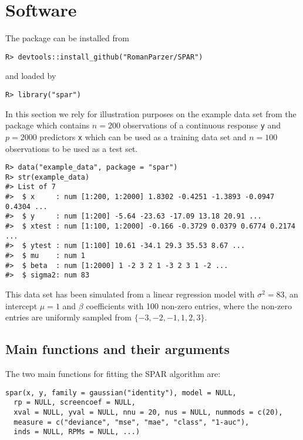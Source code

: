 \documentclass[
  article,
  nojss]{jss}
\begin{document}
\section{Software}\label{sec-software}

The package can be installed from 

\begin{verbatim}
R> devtools::install_github("RomanParzer/SPAR")
\end{verbatim}

and loaded by

\begin{verbatim}
R> library("spar")
\end{verbatim}

In this section we rely for illustration purposes on the example data
set from the package which contains \(n=200\) observations of a
continuous response \texttt{y} and \(p=2000\) predictors \texttt{x}
which can be used as a training data set and \(n=100\) observations to
be used as a test set.

\begin{verbatim}
R> data("example_data", package = "spar")
R> str(example_data)
#> List of 7
#>  $ x     : num [1:200, 1:2000] 1.8302 -0.4251 -1.3893 -0.0947 0.4304 ...
#>  $ y     : num [1:200] -5.64 -23.63 -17.09 13.18 20.91 ...
#>  $ xtest : num [1:100, 1:2000] -0.166 -0.3729 0.0379 0.6774 0.2174 ...
#>  $ ytest : num [1:100] 10.61 -34.1 29.3 35.53 8.67 ...
#>  $ mu    : num 1
#>  $ beta  : num [1:2000] 1 -2 3 2 1 -3 2 3 1 -2 ...
#>  $ sigma2: num 83
\end{verbatim}

This data set has been simulated from a linear regression model with
\(\sigma^2=83\), an intercept \(\mu=1\) and \(\beta\) coefficients with
100 non-zero entries, where the non-zero entries are uniformly sampled
from \(\{-3,-2,-1,1,2,3\}\).

\subsection{Main functions and their
arguments}\label{main-functions-and-their-arguments}

The two main functions for fitting the SPAR algorithm are:

\begin{verbatim}
spar(x, y, family = gaussian("identity"), model = NULL, 
  rp = NULL, screencoef = NULL,
  xval = NULL, yval = NULL, nnu = 20, nus = NULL, nummods = c(20),
  measure = c("deviance", "mse", "mae", "class", "1-auc"),
  inds = NULL, RPMs = NULL, ...)
\end{verbatim}
\end{document}
